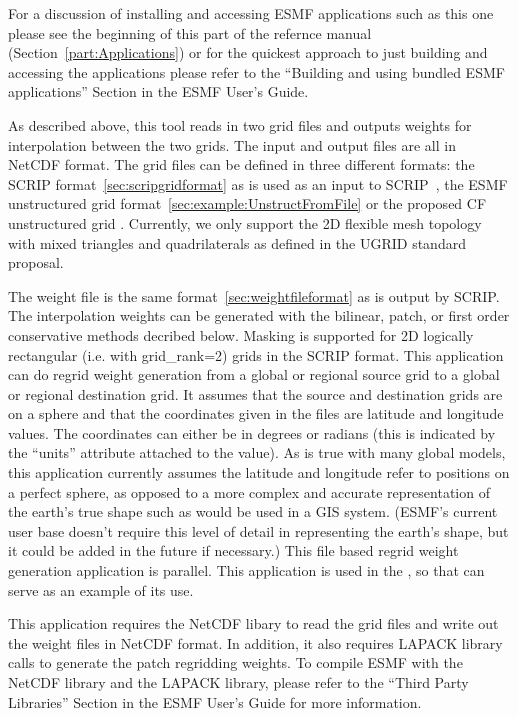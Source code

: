 For a discussion of installing and accessing ESMF applications such as this one please see the beginning of this part of the refernce manual (Section~\ref{part:Applications}) or for the quickest approach to just building and accessing the applications please refer to the ``Building and using bundled ESMF applications'' Section in the ESMF User's Guide.

As described above, this tool reads in
two grid files and outputs weights for interpolation
between the two grids. The input and output files are all in NetCDF format. The grid files can be defined in three
different formats:  the SCRIP format~\ref{sec:scripgridformat} as is used as an input to SCRIP~\cite{ref:SCRIP}, 
the ESMF unstructured grid format~\ref{sec:example:UnstructFromFile} or the proposed CF unstructured grid 
. 
Currently, we only support the 2D flexible mesh topology with mixed triangles and quadrilaterals as defined in the UGRID standard proposal.

The weight file is the same format~\ref{sec:weightfileformat} as is 
output by SCRIP. The interpolation weights can be generated with
the bilinear, patch, or first order conservative methods decribed below. Masking is supported for 2D logically rectangular (i.e. with grid\_rank=2) grids in the SCRIP format. This application 
can do regrid weight generation from a global or regional source grid to a global or regional destination grid.
It assumes that the source and destination grids are on a sphere and that the coordinates given in 
the files are latitude and longitude values. The coordinates can either be in degrees or radians (this is indicated by the ``units'' attribute attached to the value). 
As is true with many global models, this application currently assumes the latitude and longitude refer to positions on a perfect sphere, as opposed to a more complex 
and accurate representation of the earth's true shape such as would be used in a GIS system. (ESMF's current user base doesn't require this level of detail in representing the earth's shape, but it could be added in the future if necessary.)  This file based regrid weight generation application 
is parallel. This application is used in the
, so that can serve as an example of its use.

This application requires the NetCDF libary to read the grid files and write
out the weight files in NetCDF format.  In addition, it also requires LAPACK
library calls to generate the patch regridding weights. To compile ESMF with
the NetCDF library and the LAPACK library, please refer to the ``Third Party
Libraries'' Section in the ESMF User's Guide for more information.

